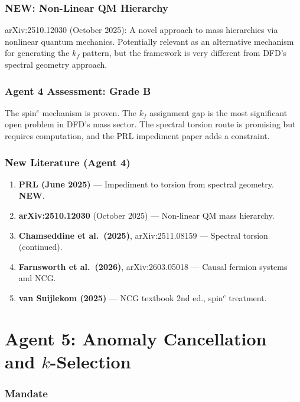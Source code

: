 \documentclass[11pt,a4paper]{article}
\newcommand{\NEW}{\textcolor{dfdblue}{\textbf{NEW}}}
\begin{document}
\section{\NEW: Non-Linear QM Hierarchy}

arXiv:2510.12030 (October 2025): A novel approach to mass hierarchies via nonlinear quantum mechanics. Potentially relevant as an alternative mechanism for generating the $k_f$ pattern, but the framework is very different from DFD's spectral geometry approach.

\section{Agent 4 Assessment: Grade B}

The spin$^c$ mechanism is proven. The $k_f$ assignment gap is the most significant open problem in DFD's mass sector. The spectral torsion route is promising but requires computation, and the PRL impediment paper adds a constraint.

\section{New Literature (Agent 4)}

\begin{enumerate}
\item \textbf{PRL (June 2025)} --- Impediment to torsion from spectral geometry. \NEW.
\item \textbf{arXiv:2510.12030} (October 2025) --- Non-linear QM mass hierarchy.
\item \textbf{Chamseddine et al.\ (2025)}, arXiv:2511.08159 --- Spectral torsion (continued).
\item \textbf{Farnsworth et al.\ (2026)}, arXiv:2603.05018 --- Causal fermion systems and NCG.
\item \textbf{van Suijlekom (2025)} --- NCG textbook 2nd ed., spin$^c$ treatment.
\end{enumerate}


\part{Agent 5: Anomaly Cancellation and $k$-Selection}
\label{part:agent5}

\section{Mandate}
\end{document}
